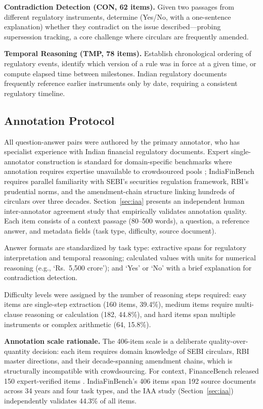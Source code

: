 \textbf{Contradiction Detection (CON, 62 items).} Given two passages from different regulatory instruments, determine (Yes/No, with a one-sentence explanation) whether they contradict on the issue described---probing supersession tracking, a core challenge where circulars are frequently amended.

\textbf{Temporal Reasoning (TMP, 78 items).} Establish chronological ordering of regulatory events, identify which version of a rule was in force at a given time, or compute elapsed time between milestones. Indian regulatory documents frequently reference earlier instruments only by date, requiring a consistent regulatory timeline.

\subsection{Annotation Protocol}

All question-answer pairs were authored by the primary annotator, who has specialist experience with Indian financial regulatory documents. Expert single-annotator construction is standard for domain-specific benchmarks where annotation requires expertise unavailable to crowdsourced pools \citep{hendrycks2021cuad, malik2021ildc, islam2023financebench}; IndiaFinBench requires parallel familiarity with SEBI's securities regulation framework, RBI's prudential norms, and the amendment-chain structure linking hundreds of circulars over three decades. Section~\ref{sec:iaa} presents an independent human inter-annotator agreement study that empirically validates annotation quality. Each item consists of a context passage (80--500 words), a question, a reference answer, and metadata fields (task type, difficulty, source document).

Answer formats are standardized by task type: extractive spans for regulatory interpretation and temporal reasoning; calculated values with units for numerical reasoning (e.g., `Rs.~5,500 crore'); and `Yes' or `No' with a brief explanation for contradiction detection.

Difficulty levels were assigned by the number of reasoning steps required: easy items are single-step extraction (160 items, 39.4\%), medium items require multi-clause reasoning or calculation (182, 44.8\%), and hard items span multiple instruments or complex arithmetic (64, 15.8\%).

\textbf{Annotation scale rationale.} The 406-item scale is a deliberate quality-over-quantity decision: each item requires domain knowledge of SEBI circulars, RBI master directions, and their decade-spanning amendment chains, which is structurally incompatible with crowdsourcing. For context, FinanceBench released 150 expert-verified items \citep{islam2023financebench}. IndiaFinBench's 406 items span 192 source documents across 34 years and four task types, and the IAA study (Section~\ref{sec:iaa}) independently validates 44.3\% of all items.

